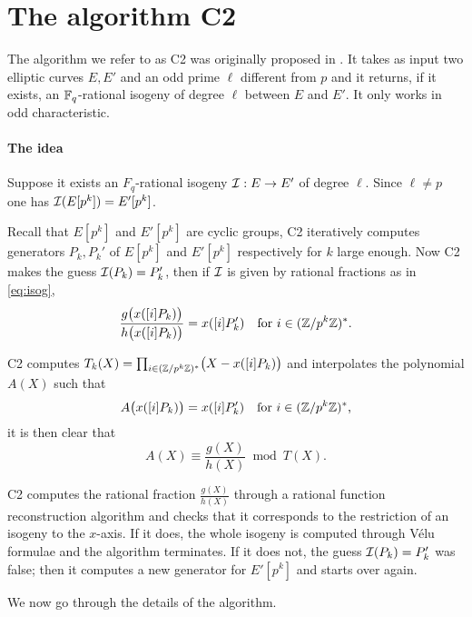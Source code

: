 \section{The algorithm C2}

The algorithm we refer to as C2 was originally proposed in
\cite{Cou96}. It takes as input two elliptic curves $E, E'$ and an odd
prime $\ell$ different from $p$ and it returns, if it exists, an
$\mathbb{F}_q$-rational isogeny of degree $\ell$ between $E$ and $E'$. It only
works in odd characteristic.

\paragraph{The idea} Suppose it exists an $F_q$-rational isogeny
$\mathcal{I}:E\rightarrow E'$ of degree $\ell$. Since $\ell\ne p$ one has
$\mathcal{I}(E[p^k]) = E'[p^k]$.

Recall that $E[p^k]$ and $E'[p^k]$ are cyclic groups, C2 iteratively
computes generators $P_k,P_k'$ of $E[p^k]$ and $E'[p^k]$ respectively
for $k$ large enough. Now C2 makes the guess $\mathcal{I}(P_k) = P_k'$, then if
$\mathcal{I}$ is given by rational fractions as in \eqref{eq:isog},
\begin{equation}
  \label{eq:C2:I}
  \frac{g\bigl(x([i]P_k)\bigr)}{h\bigl(x([i]P_k)\bigr)} = x([i]P_k')
  \quad\text{for $i\in(\mathbb{Z}/p^k\mathbb{Z})^\ast$.} 
\end{equation}

C2 computes $T_k(X) = \prod_{i\in(\mathbb{Z}/p^k\mathbb{Z})^\ast}\bigl(X-x([i]P_k)\bigr)$ and
interpolates the polynomial $A(X)$ such that
\begin{equation}
  \label{eq:C2:A}
  A\bigl(x([i]P_k)\bigr) = x([i]P_k') \quad\text{for $i\in(\mathbb{Z}/p^k\mathbb{Z})^\ast$,} 
\end{equation}
it is then clear that
\begin{equation}
  \label{eq:C2:RR}
  A(X) \equiv \frac{g(X)}{h(X)} \bmod T(X)
  \text{.}
\end{equation}

C2 computes the rational fraction $\frac{g(X)}{h(X)}$ through a
rational function reconstruction algorithm \cite[\incomplete]{vzGG}
and checks that it corresponds to the restriction of an isogeny to the
$x$-axis. If it does, the whole isogeny is computed through Vélu
formulae and the algorithm terminates. If it does not, the guess
$\mathcal{I}(P_k) = P_k'$ was false; then it computes a new generator for
$E'[p^k]$ and starts over again.

We now go through the details of the algorithm.

